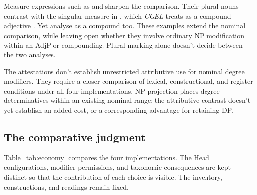 \documentclass[12pt]{article}
\begin{document}
Measure expressions such as  and  sharpen the comparison. Their plural nouns contrast with the singular measure in , which \textit{CGEL} treats as a compound adjective \citep[552, 1660]{huddleston2002}. Yet \textcite[68]{alegregordon1996} analyse  as a compound too. These examples extend the nominal comparison, while leaving open whether they involve ordinary NP modification within an AdjP or compounding. Plural marking alone doesn't decide between the two analyses.

The attestations don't establish unrestricted attributive use for nominal degree modifiers. They require a closer comparison of lexical, constructional, and register conditions under all four implementations. NP projection places degree determinatives within an existing nominal range; the attributive contrast doesn't yet establish an added cost, or a corresponding advantage for retaining DP.

\subsection{The comparative judgment}\label{sec:costs}

Table~\ref{tab:economy} compares the four implementations. The Head configurations, modifier permissions, and taxonomic consequences are kept distinct so that the contribution of each choice is visible. The inventory, constructions, and readings remain fixed.
\end{document}
